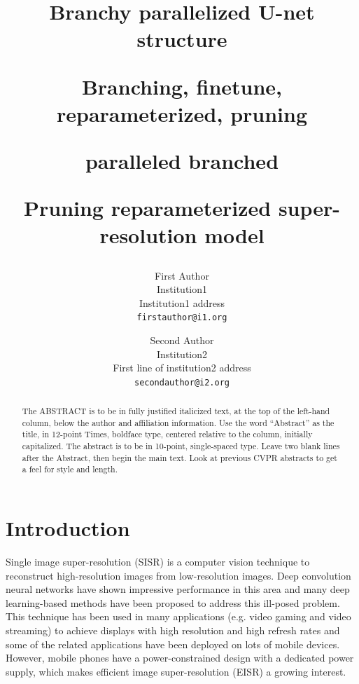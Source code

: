 \documentclass[10pt,twocolumn,letterpaper]{article}
\begin{document}
\title{Branchy parallelized U-net structure 

Branching, finetune, reparameterized, pruning

paralleled 
branched

Pruning reparameterized super-resolution model}

\author{First Author\\
Institution1\\
Institution1 address\\
{\tt\small firstauthor@i1.org}
\and
Second Author\\
Institution2\\
First line of institution2 address\\
{\tt\small secondauthor@i2.org}
}
\maketitle

\begin{abstract}
   The ABSTRACT is to be in fully justified italicized text, at the top of the left-hand column, below the author and affiliation information.
   Use the word ``Abstract'' as the title, in 12-point Times, boldface type, centered relative to the column, initially capitalized.
   The abstract is to be in 10-point, single-spaced type.
   Leave two blank lines after the Abstract, then begin the main text.
   Look at previous CVPR abstracts to get a feel for style and length.
\end{abstract}

\section{Introduction}
\label{sec:intro}

Single image super-resolution (SISR) is a computer vision technique to reconstruct high-resolution images from low-resolution images. Deep convolution neural networks have shown impressive performance in this area and many deep learning-based methods have been proposed to address this ill-posed problem.
This technique has been used in many applications (e.g. video gaming\cite{10.1145/2751496.2751502} and video streaming\cite{kimNeuralEnhancedLiveStreaming2020,yeoNeuralAdaptiveContentaware2018,maoNeuralAdaptiveVideo2017}) to achieve displays with high resolution and high refresh rates and some of the related applications have been deployed on lots of mobile devices\cite{yeoNEMOEnablingNeuralenhanced2020,mehtaEVRNetEfficientVideo2021}.
However, mobile phones have a power-constrained design with a dedicated power supply, which makes efficient image super-resolution (EISR) a growing interest.
\end{document}
